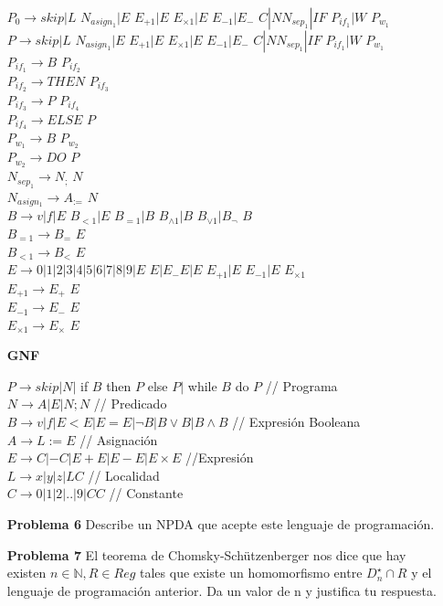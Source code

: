 \documentclass{article}
\begin{document}
\begin{enumerate}
$P_{0} \rightarrow skip |L$ $N_{asign_1}|E$ $E_{+1}|E$ $E_{\times1}|E$ $E_{-1}|E_{-}$ $C|N N_{sep_1}| IF$ $P_{if_1} |W$ $P_{w_1}$\\
$P \rightarrow skip |L$ $N_{asign_1}|E$ $E_{+1}|E$ $E_{\times1}|E$ $E_{-1}|E_{-}$ $C|N N_{sep_1}| IF$ $P_{if_1} |W$ $P_{w_1}$\\
$P_{if_1} \rightarrow B$ $P_{if_2}$\\
$P_{if_2} \rightarrow THEN$ $P_{if_3}$\\
$P_{if_3} \rightarrow P$ $P_{if_4}$\\
$P_{if_4} \rightarrow ELSE$ $P$\\
$P_{w_1} \rightarrow B$ $P_{w_2}$\\
$P_{w_2} \rightarrow DO$ $P$\\
$N_{sep_1}  \rightarrow N_{;}$ $N$\\
$N_{asign_1} \rightarrow A_{:=}$ $N$\\
$B \rightarrow v|f| E$ $B_{<1} | E$ $B_{=1} | B$ $B_{\wedge 1} | B$  $B_{\vee 1} | B_{\neg}$ $B $\\
$B_{=1} \rightarrow B_{=}$ $E$\\
$B_{<1} \rightarrow B_{<}$ $E$\\
$E \rightarrow 0|1|2|3|4|5|6|7|8|9|E$ $E|E_{-} E|E$ $E_{+1}|E$ $E_{-1}|E$ $E_{\times1}$\\
$E_{+1} \rightarrow E_{+}$ $E$\\
$E_{-1} \rightarrow E_{-}$ $E$\\
$E_{\times1} \rightarrow E_{\times}$ $E$\\


\item[\bf{GNF}]

$P \rightarrow skip |N|$ if $B$ then $P$ else $P |$ while $B$ do $P$   // Programa\\ 
$N \rightarrow A|E|N;N$ // Predicado\\
$B \rightarrow v|f|E<E|E=E|\neg B |B \vee B| B \wedge B $ // Expresión Booleana\\
$A \rightarrow L:=E$ // Asignación\\
$E \rightarrow C|-C|E+E|E-E|E \times E$ //Expresión\\
$L \rightarrow x|y|z|LC$ // Localidad\\
$C \rightarrow 0|1|2|..|9|CC$ // Constante




\item[\bf{Problema 6}]  Describe un NPDA que acepte este lenguaje de programación.
\item[\bf{Problema 7}]  El teorema de Chomsky-Schützenberger nos dice que hay existen $n \in \mathbb{N}, R \in Reg$ tales que existe un homomorfismo entre $D^{\star}_n \cap R$ y el lenguaje de programación anterior. Da un valor de n y justifica tu respuesta.


\end{enumerate}
\end{document}
